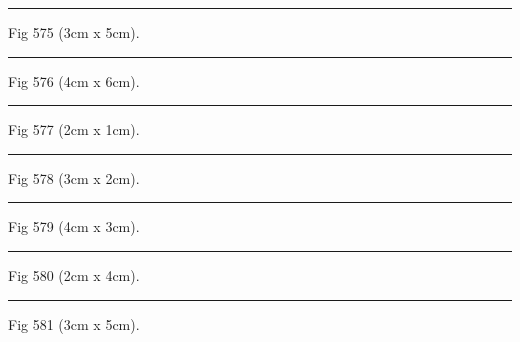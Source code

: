 \documentclass[a4paper,11pt]{article}
\begin{document}
\begin{swarmwrap}%
  \begin{minipage}[t]{3cm}
    \centering
    \rule{\linewidth}{5cm}
    {\footnotesize Fig 575 (3cm x 5cm).}
  \end{minipage}%
\end{swarmwrap}%
\swarmwrapnext
\lipsum[125]%

\begin{swarmwrap}%
  \begin{minipage}[t]{4cm}
    \centering
    \rule{\linewidth}{6cm}
    {\footnotesize Fig 576 (4cm x 6cm).}
  \end{minipage}%
\end{swarmwrap}%
\swarmwrapnext
\lipsum[126]%

\begin{swarmwrap}%
  \begin{minipage}[t]{2cm}
    \centering
    \rule{\linewidth}{1cm}
    {\footnotesize Fig 577 (2cm x 1cm).}
  \end{minipage}%
\end{swarmwrap}%
\swarmwrapnext
\lipsum[127]%

\begin{swarmwrap}%
  \begin{minipage}[t]{3cm}
    \centering
    \rule{\linewidth}{2cm}
    {\footnotesize Fig 578 (3cm x 2cm).}
  \end{minipage}%
\end{swarmwrap}%
\swarmwrapnext
\lipsum[128]%

\begin{swarmwrap}%
  \begin{minipage}[t]{4cm}
    \centering
    \rule{\linewidth}{3cm}
    {\footnotesize Fig 579 (4cm x 3cm).}
  \end{minipage}%
\end{swarmwrap}%
\swarmwrapnext
\lipsum[129]%

\begin{swarmwrap}%
  \begin{minipage}[t]{2cm}
    \centering
    \rule{\linewidth}{4cm}
    {\footnotesize Fig 580 (2cm x 4cm).}
  \end{minipage}%
\end{swarmwrap}%
\swarmwrapnext
\lipsum[130]%

\begin{swarmwrap}%
  \begin{minipage}[t]{3cm}
    \centering
    \rule{\linewidth}{5cm}
    {\footnotesize Fig 581 (3cm x 5cm).}
  \end{minipage}%
\end{swarmwrap}%
\swarmwrapnext
\lipsum[131]%
\end{document}
